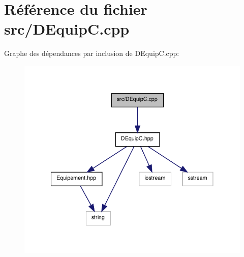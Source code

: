 \section{Référence du fichier src/\-D\-Equip\-C.cpp}
\label{_d_equip_c_8cpp}
Graphe des dépendances par inclusion de D\-Equip\-C.\-cpp\-:\nopagebreak
\begin{figure}[H]
\begin{center}
\leavevmode
\includegraphics[width=318pt]{_d_equip_c_8cpp__incl}
\end{center}
\end{figure}
